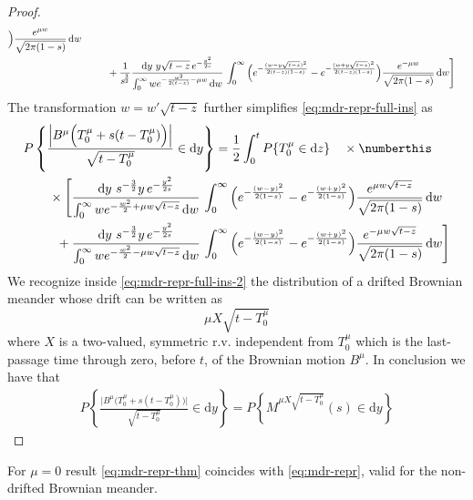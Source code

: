 \begin{proof}
\begin{align*}
	\Big ) 
	\frac{  e^{ \mu w } } {\sqrt{2 \pi (1-s)}}
	\, \mathrm d w 
	\\
	& \qquad \hphantom{\Bigg[  }  + 
	\frac{1}{s^{\!\frac 32} } 
	\frac{
		\mathrm d y \,\, 
		y \sqrt{t-z} \, e^{ - \frac{ y^2}{2 s }} 		
	}{
		\int_0^\infty 
		w 
		e^{- \frac{ w^2}{2 (t-z)}  - \mu w}    
		\, \mathrm d w 		
	}\,
	\int_0^\infty 
	\Big( 
	e^{- \frac{ ( w - y \sqrt{t-z}   )^2  }{    2(t-z)(1-s)}} 
	- e^{   - \frac{ (w+y \sqrt{t-z} )^2}{2 ( t-z)(1-s)}   }
	\Big ) 
	\frac{  e^{ - \mu w } } {\sqrt{2 \pi (1-s)}}
	\, \mathrm d w
	\Bigg] 
	\end{align*}
	The transformation $ w = w' \sqrt{t-z} $ further simplifies \eqref{eq:mdr-repr-full-ins}
	as
	\begin{align*}
	&
	P\left\{   
	\frac { 
		\Big | B^\mu\Big ( T_0^\mu + s ( t - T_0^\mu) \Big )  \Big |    
	}
	{
		\sqrt{t - T^\mu_0}
	} \in \mathrm d y 
	\right\} 
	=
	\frac{1}{2}
	\int_0^t P \{ T_0^\mu \in \mathrm d z \}  \quad \times
	\numberthis 
	\label{eq:mdr-repr-full-ins-2}
	\\
	& \qquad \times 
	\Bigg[ 
	\frac{
		\mathrm d y \,\, 
		s^{ -\frac 32}
		y \, e^{ - \frac{ y^2}{2 s }} 		
	}{
		\int_0^\infty 
		w 
		e^{- \frac{ w^2}{2}  + \mu w\sqrt{t-z}}    
		\, \mathrm d w 		
	}\,
	\int_0^\infty 
	\Big( 
	e^{- \frac{ ( w - y    )^2  }{    2(1-s)}} 
	- e^{   - \frac{ (w+y  )^2}{2 (1-s)}   }
	\Big ) 
	\frac{  e^{ \mu w \sqrt{t-z}} } {\sqrt{2 \pi (1-s)}}
	\, \mathrm d w 
	\\
	& \qquad \hphantom{\Bigg[  }  + 
	\frac{
		\mathrm d y \,\, 
		s^{ -\frac 32}
		y \, e^{ - \frac{ y^2}{2 s }} 		
	}{
		\int_0^\infty 
		w 
		e^{- \frac{ w^2}{2 }  - \mu w\sqrt{t-z}}    
		\, \mathrm d w 		
	}\,
	\int_0^\infty 
	\Big( 
	e^{- \frac{ ( w - y   )^2  }{    2(1-s)}} 
	- e^{   - \frac{ (w+y  )^2}{2 (1-s)}   }
	\Big ) 
	\frac{  e^{ - \mu w \sqrt{t-z} } } {\sqrt{2 \pi (1-s)}}
	\, \mathrm d w
	\Bigg] 
	\end{align*}
	We recognize  inside \eqref{eq:mdr-repr-full-ins-2} the distribution of a drifted Brownian meander
	whose drift can be written as 
	\[
	\mu X \sqrt{t - T^\mu_0} 
	\]
	where $ X $ is a two-valued, symmetric r.v. independent from $ T^\mu_0  $ which is 
	the last-passage time through zero, before $ t $, of  the Brownian motion $ B^\mu $. 
	In conclusion we have that 
	\begin{align*}
	P\left\{   
	\frac { 
		\Big | B^\mu\Big ( T_0^\mu + s ( t - T_0^\mu) \Big )  \Big |    
	}
	{
		\sqrt{t - T^\mu_0}
	} \in \mathrm d y 
	\right\} 
	=
	P\left\{ 
	M^{\mu X \sqrt{t - T^\mu_0} } ( s) \in \mathrm d y
	\right\}
	\end{align*}
\end{proof}
%
%
%
%
\begin{remark}
	For $ \mu = 0 $ result \eqref{eq:mdr-repr-thm} coincides with \eqref{eq:mdr-repr}, valid 
	for the non-drifted Brownian meander.
\end{remark}














